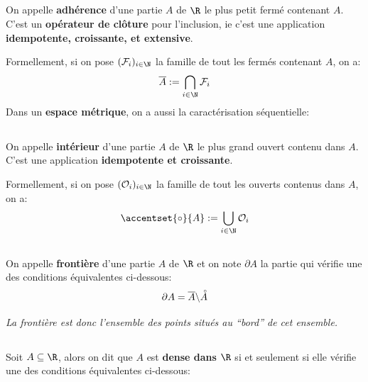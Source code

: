 \subsection*{}
On appelle \textbf{adhérence} d'une partie \(A\) de \(\R\) le plus petit fermé contenant \(A\). C'est un \textbf{opérateur de clôture} pour l'inclusion, ie c'est une application \textbf{idempotente, croissante, et extensive}.\<

Formellement, si on pose \((\mathcal{F}_i)_{i \in \N}\) la famille de tout les fermés contenant \(A\), on a:
\[
    \overline{A} := \bigcap_{i \in \N} \mathcal{F}_i
\]
Dans un \textbf{espace métrique}, on a aussi la caractérisation séquentielle:
\begin{center}
\end{center}

\subsection*{}
On appelle \textbf{intérieur} d'une partie \(A\) de \(\R\) le plus grand ouvert contenu dans \(A\). C'est une application \textbf{idempotente et croissante}.\<

Formellement, si on pose \((\mathcal{O}_i)_{i \in \N}\) la famille de tout les ouverts contenus dans \(A\), on a:
\[
    \accentset{\circ}{A} := \bigcup_{i \in \N} \mathcal{O}_i
\]

\subsection*{}
On appelle \textbf{frontière} d'une partie \(A\) de \(\R\) et on note \(\partial A\) la partie qui vérifie une des conditions équivalentes ci-dessous:
\[
        \partial A = \overline{A} \backslash \accentset{\circ}{A}
\]
\begin{center}
    \textit{
        La frontière est donc l'ensemble des points situés au ``bord'' de cet ensemble.
    }
\end{center}

\subsection*{}
Soit \(A \subseteq \R\), alors on dit que \(A\) est \textbf{dense dans} \(\R\) si et seulement si elle vérifie une des conditions équivalentes ci-dessous:


